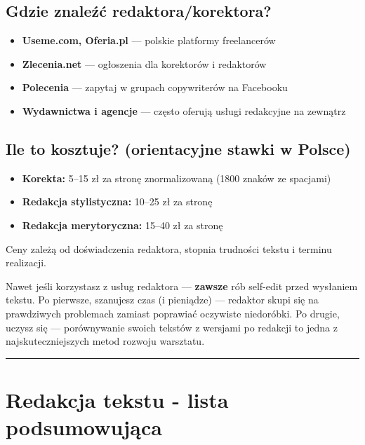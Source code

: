 \documentclass[
  12pt,
  a4paper,
  twoside,
  openright,
  12pt,
  DIV=12,
  BCOR=12mm]{scrbook}
\providecommand{\tightlist}{%
  \setlength{\itemsep}{0pt}\setlength{\parskip}{0pt}}\usepackage{longtable,booktabs,array}
\newcommand{\decoline}{%
  \begin{center}
    \textcolor{bordergray}{\rule{0.3\textwidth}{0.5pt}}
  \end{center}
}
\begin{document}
\subsection{Gdzie znaleźć
redaktora/korektora?}\label{gdzie-znaleux17aux107-redaktorakorektora}

\begin{itemize}
\tightlist
\item
  \textbf{Useme.com, Oferia.pl} --- polskie platformy freelancerów
\item
  \textbf{Zlecenia.net} --- ogłoszenia dla korektorów i redaktorów
\item
  \textbf{Polecenia} --- zapytaj w grupach copywriterów na Facebooku
\item
  \textbf{Wydawnictwa i agencje} --- często oferują usługi redakcyjne na
  zewnątrz
\end{itemize}

\subsection{Ile to kosztuje? (orientacyjne stawki w
Polsce)}\label{ile-to-kosztuje-orientacyjne-stawki-w-polsce}

\begin{itemize}
\tightlist
\item
  \textbf{Korekta:} 5--15 zł za stronę znormalizowaną (1800 znaków ze
  spacjami)
\item
  \textbf{Redakcja stylistyczna:} 10--25 zł za stronę
\item
  \textbf{Redakcja merytoryczna:} 15--40 zł za stronę
\end{itemize}

Ceny zależą od doświadczenia redaktora, stopnia trudności tekstu i
terminu realizacji.

\begin{wazne}
Nawet jeśli korzystasz z usług redaktora --- \textbf{zawsze} rób self-edit przed wysłaniem tekstu. Po pierwsze, szanujesz czas (i pieniądze) --- redaktor skupi się na prawdziwych problemach zamiast poprawiać oczywiste niedoróbki. Po drugie, uczysz się --- porównywanie swoich tekstów z wersjami po redakcji to jedna z najskuteczniejszych metod rozwoju warsztatu.
\end{wazne}

\decoline

\section{Redakcja tekstu - lista
podsumowująca}\label{redakcja-tekstu---lista-podsumowujux105ca}
\end{document}
